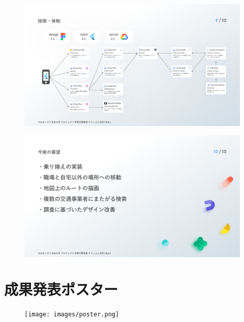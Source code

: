 \begin{figure}[H]
    \includegraphics[width=14cm]{images/slide9.png}
    \label{fig:slide9}
\end{figure}
\begin{figure}[H]
    \includegraphics[width=14cm]{images/slide10.png}
    \label{fig:slide10}
\end{figure}

\section{成果発表ポスター}
\begin{figure}[H]
    \centering
    \texttt{[image: images/poster.png]}
\end{figure}
